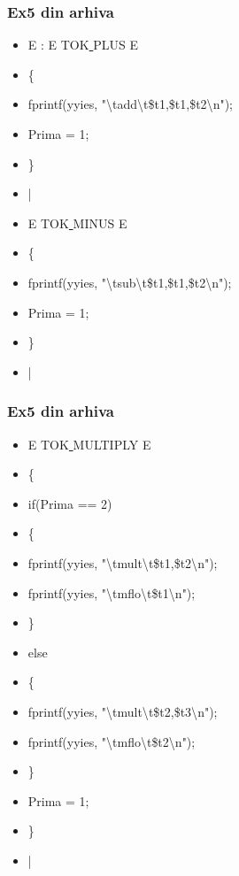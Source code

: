 \documentclass[pdf]{beamer}
\begin{document}
\begin{frame}
\frametitle{Ex5 din arhiva}
\begin{itemize}
\item
E : E TOK\underline{ }PLUS E 
\item \quad \hspace{2mm}
	\{ 
\item \qquad \hspace{2mm}
		fprintf(yyies, "\textbackslash{t}add\textbackslash{t}\$t1,\$t1,\$t2\textbackslash{n}");
\item \qquad \hspace{2mm}
		Prima = 1;
\item \quad \hspace{2mm}
	\}
\item \quad
    |
\item \quad    
    E TOK\underline{ }MINUS E
\item \quad \hspace{2mm}
	\{
\item \qquad \hspace{2mm}
		fprintf(yyies, "\textbackslash{t}sub\textbackslash{t}\$t1,\$t1,\$t2\textbackslash{n}");
\item \qquad \hspace{2mm}
		Prima = 1;
\item \quad \hspace{2mm}
	\}
\item \quad
    |
\end{itemize}
\end{frame}



\begin{frame}
\frametitle{Ex5 din arhiva}
\begin{itemize}
\item
 E TOK\underline{ }MULTIPLY E 
\item \quad
	\{
\item \qquad 
		if(Prima == 2)
\item \qquad 
		\{
\item \qquad \quad
			fprintf(yyies, "\textbackslash{t}mult\textbackslash{t}\$t1,\$t2\textbackslash{n}");
\item \qquad \quad
			fprintf(yyies, "\textbackslash{t}mflo\textbackslash{t}\$t1\textbackslash{n}");
\item \qquad
		\}
\item \qquad
		else 
\item \qquad
		\{
\item \qquad \quad
			fprintf(yyies, "\textbackslash{t}mult\textbackslash{t}\$t2,\$t3\textbackslash{n}");
\item \qquad \quad
			fprintf(yyies, "\textbackslash{t}mflo\textbackslash{t}\$t2\textbackslash{n}");
\item \qquad 
		\}
\item \qquad
		Prima = 1;
\item \quad
	\}
\item \vspace{5mm}
    |
\end{itemize}
\end{frame}
\end{document}
